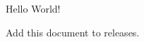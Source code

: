 \documentclass{article}
\begin{document}
Hello World!

Add this document to releases.
\end{document}
